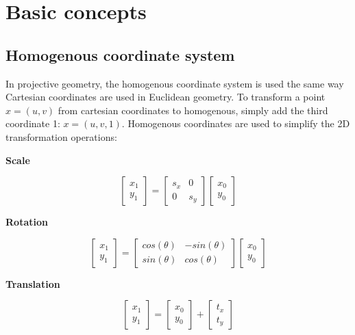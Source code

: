 \chapter{Basic concepts}
\label{chapter:epipilar_geo}

\section{Homogenous coordinate system}

In projective geometry, the homogenous coordinate system is used the same way Cartesian coordinates are used in Euclidean geometry. 
To transform a point $x=(u, v)$ from cartesian coordinates to homogenous, simply add the third coordinate 1: $x=(u, v, 1)$.
Homogenous coordinates are used to simplify the 2D transformation operations:

\begin{center}
    \textbf{Scale}
\end{center}
$$
\begin{bmatrix}
    x_1 \\ y_1
\end{bmatrix} = 
\begin{bmatrix}
    s_x & 0 \\
    0 & s_y
\end{bmatrix}
\begin{bmatrix}
    x_0 \\ y_0
\end{bmatrix}
$$ 
\begin{center}
    \textbf{Rotation}    
\end{center}
$$
\begin{bmatrix}
    x_1 \\ y_1
\end{bmatrix} = 
\begin{bmatrix}
    cos(\theta) & -sin(\theta) \\
    sin(\theta) & cos(\theta)
\end{bmatrix}
\begin{bmatrix}
    x_0 \\ y_0
\end{bmatrix}
$$
\begin{center}
    \textbf{Translation}    
\end{center}
$$
\begin{bmatrix}
    x_1 \\ y_1
\end{bmatrix} = 
\begin{bmatrix}
    x_0 \\ y_0
\end{bmatrix} +
\begin{bmatrix}
    t_x \\ t_y
\end{bmatrix}
$$ 

